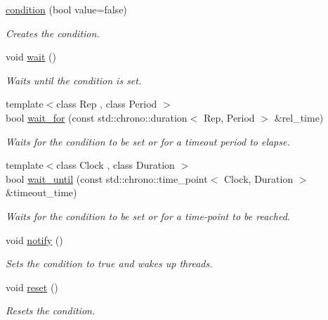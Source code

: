 \begin{DoxyCompactItemize}
\item 
\hyperlink{classcpen333_1_1thread_1_1condition_a3bd725835dd906ab14b7796cb425fe71}{condition} (bool value=false)
\begin{DoxyCompactList}\small\item\em Creates the condition. \end{DoxyCompactList}\item 
void \hyperlink{classcpen333_1_1thread_1_1condition_a8f04e3bd62b29535f8a98ded4efafea2}{wait} ()
\begin{DoxyCompactList}\small\item\em Waits until the condition is set. \end{DoxyCompactList}\item 
{\footnotesize template$<$class Rep , class Period $>$ }\\bool \hyperlink{classcpen333_1_1thread_1_1condition_a14464ca04c1e3e4a6ae62321bfe1ad3a}{wait\+\_\+for} (const std\+::chrono\+::duration$<$ Rep, Period $>$ \&rel\+\_\+time)
\begin{DoxyCompactList}\small\item\em Waits for the condition to be set or for a timeout period to elapse. \end{DoxyCompactList}\item 
{\footnotesize template$<$class Clock , class Duration $>$ }\\bool \hyperlink{classcpen333_1_1thread_1_1condition_ad415e3be6db8f186d2efaa1c897ffca5}{wait\+\_\+until} (const std\+::chrono\+::time\+\_\+point$<$ Clock, Duration $>$ \&timeout\+\_\+time)
\begin{DoxyCompactList}\small\item\em Waits for the condition to be set or for a time-\/point to be reached. \end{DoxyCompactList}\item 
void \hyperlink{classcpen333_1_1thread_1_1condition_a12be978f0adb0bf17080797a38b6ead4}{notify} ()
\begin{DoxyCompactList}\small\item\em Sets the condition to {\ttfamily true} and wakes up threads. \end{DoxyCompactList}\item 
void \hyperlink{classcpen333_1_1thread_1_1condition_a99e8696703e31632cccc1d17b0b18d2f}{reset} ()
\begin{DoxyCompactList}\small\item\em Resets the condition. \end{DoxyCompactList}\end{DoxyCompactItemize}


